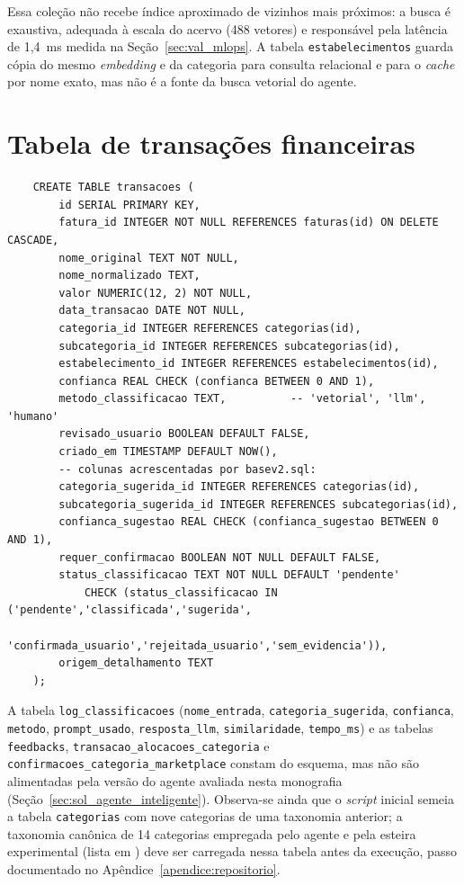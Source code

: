 \begin{apendicesenv}
Essa coleção não recebe índice aproximado de vizinhos mais próximos: a busca é exaustiva, adequada à escala do acervo (488 vetores) e responsável pela latência de 1,4~ms medida na Seção~\ref{sec:val_mlops}. A tabela \texttt{estabelecimentos} guarda cópia do mesmo \textit{embedding} e da categoria para consulta relacional e para o \textit{cache} por nome exato, mas não é a fonte da busca vetorial do agente.

\section{Tabela de transações financeiras}
{\footnotesize
\begin{verbatim}
	CREATE TABLE transacoes (
		id SERIAL PRIMARY KEY,
		fatura_id INTEGER NOT NULL REFERENCES faturas(id) ON DELETE CASCADE,
		nome_original TEXT NOT NULL,
		nome_normalizado TEXT,
		valor NUMERIC(12, 2) NOT NULL,
		data_transacao DATE NOT NULL,
		categoria_id INTEGER REFERENCES categorias(id),
		subcategoria_id INTEGER REFERENCES subcategorias(id),
		estabelecimento_id INTEGER REFERENCES estabelecimentos(id),
		confianca REAL CHECK (confianca BETWEEN 0 AND 1),
		metodo_classificacao TEXT,          -- 'vetorial', 'llm', 'humano'
		revisado_usuario BOOLEAN DEFAULT FALSE,
		criado_em TIMESTAMP DEFAULT NOW(),
		-- colunas acrescentadas por basev2.sql:
		categoria_sugerida_id INTEGER REFERENCES categorias(id),
		subcategoria_sugerida_id INTEGER REFERENCES subcategorias(id),
		confianca_sugestao REAL CHECK (confianca_sugestao BETWEEN 0 AND 1),
		requer_confirmacao BOOLEAN NOT NULL DEFAULT FALSE,
		status_classificacao TEXT NOT NULL DEFAULT 'pendente'
		    CHECK (status_classificacao IN ('pendente','classificada','sugerida',
		           'confirmada_usuario','rejeitada_usuario','sem_evidencia')),
		origem_detalhamento TEXT
	);
\end{verbatim}
}

A tabela \texttt{log\_classificacoes} (\texttt{nome\_entrada}, \texttt{categoria\_sugerida}, \texttt{confianca}, \texttt{metodo}, \texttt{prompt\_usado}, \texttt{resposta\_llm}, \texttt{similaridade}, \texttt{tempo\_ms}) e as tabelas \texttt{feedbacks}, \texttt{transacao\_alocacoes\_categoria} e \texttt{confirmacoes\_categoria\_marketplace} constam do esquema, mas não são alimentadas pela versão do agente avaliada nesta monografia (Seção~\ref{sec:sol_agente_inteligente}). Observa-se ainda que o \textit{script} inicial semeia a tabela \texttt{categorias} com nove categorias de uma taxonomia anterior; a taxonomia canônica de 14 categorias empregada pelo agente e pela esteira experimental (lista em ) deve ser carregada nessa tabela antes da execução, passo documentado no Apêndice~\ref{apendice:repositorio}.


\end{apendicesenv}
